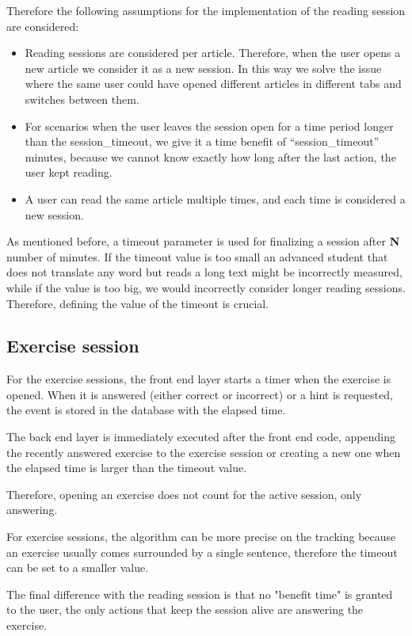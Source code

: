Therefore the following assumptions for the implementation of the reading session are considered:
\begin{itemize}
\item Reading sessions are considered per article. Therefore, when the user opens a new article we consider it as a new session. In this way we solve the issue where the same user could have opened different articles in different tabs and switches between them.

\item For scenarios when the user leaves the session open for a time period longer than the session\_timeout, we give it a time benefit of “session\_timeout” minutes, because we cannot know exactly how long after the last action, the user kept reading. 

\item A user can read the same article multiple times, and each time is considered a new session.
\end{itemize}

As mentioned before, a timeout parameter is used for finalizing a session after \textbf{N} number of minutes. If the timeout value is too small an advanced student that does not translate any word but reads a long text might be incorrectly measured, while if the value is too big, we would incorrectly consider longer reading sessions. Therefore, defining the value of the timeout is crucial. 


\subsection{Exercise session}
For the exercise sessions, the front end layer starts a timer when the exercise is opened. When it is answered (either correct or incorrect) or a hint is requested, the event is stored in the database with the elapsed time.

The back end layer is immediately executed after the front end code, appending the recently answered exercise to the exercise session or creating a new one when the elapsed time is larger than the timeout value.

Therefore, opening an exercise does not count for the active session, only answering.

For exercise sessions, the algorithm can be more precise on the tracking because an exercise usually comes surrounded by a single sentence, therefore the timeout can be set to a smaller value. 

The final difference with the reading session is that no "benefit time" is granted to the user, the only actions that keep the session alive are answering the exercise.





